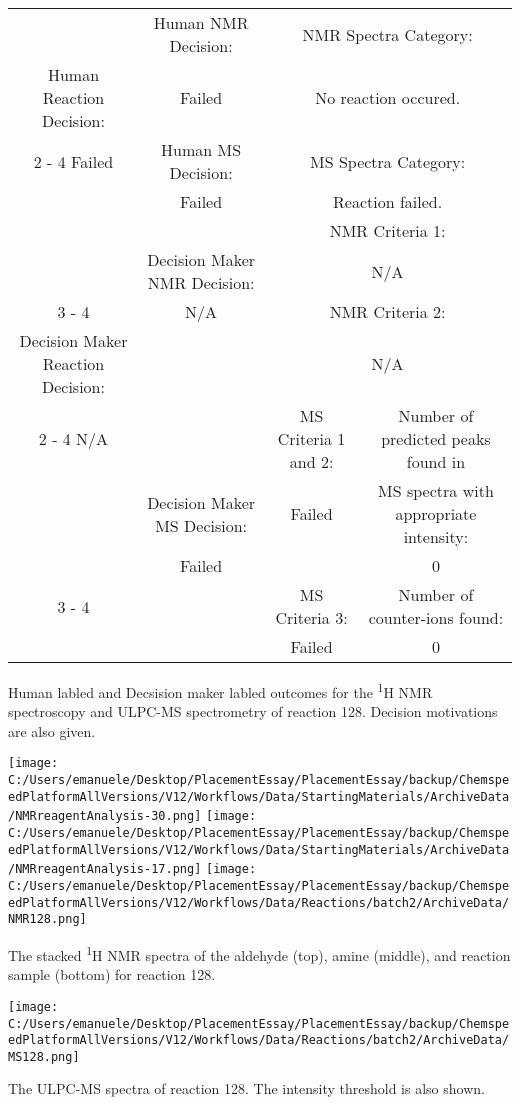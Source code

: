 \documentclass{article}%
\begin{document}
\begin{Decision Table}[H]%
\begin{tabular}{|c|c|c|c|}%
\hline%
&Human NMR Decision:&\multicolumn{2}{|c|}{NMR Spectra Category:}\\%
Human Reaction Decision:&Failed&\multicolumn{2}{|c|}{No reaction occured.}\\%
\cline{2%
-%
4}%
Failed&Human MS Decision:&\multicolumn{2}{|c|}{MS Spectra Category:}\\%
&Failed&\multicolumn{2}{|c|}{Reaction failed.}\\%
\hline%
&&\multicolumn{2}{|c|}{NMR Criteria 1:}\\%
&Decision Maker NMR Decision:&\multicolumn{2}{|c|}{N/A}\\%
\cline{3%
-%
4}%
&N/A&\multicolumn{2}{|c|}{NMR Criteria 2:}\\%
Decision Maker Reaction Decision:&&\multicolumn{2}{|c|}{N/A}\\%
\cline{2%
-%
4}%
N/A&&MS Criteria 1 and 2:&Number of predicted peaks found in\\%
&Decision Maker MS Decision:&Failed&MS spectra with appropriate intensity:\\%
&Failed&&0\\%
\cline{3%
-%
4}%
&&MS Criteria 3:&Number of counter{-}ions found:\\%
&&Failed&0\\%
\hline%
\end{tabular}%
\caption{Human labled and Decsision maker labled outcomes for the \textsuperscript{1}H NMR spectroscopy and ULPC-MS spectrometry of reaction 128. Decision motivations are also given.}%
\end{Decision Table}%
\begin{NMR Spectra}[H]%
\begin{center}%
\texttt{[image: C:/Users/emanuele/Desktop/PlacementEssay/PlacementEssay/backup/ChemspeedPlatformAllVersions/V12/Workflows/Data/StartingMaterials/ArchiveData/NMRreagentAnalysis-30.png]}\hfill%
\texttt{[image: C:/Users/emanuele/Desktop/PlacementEssay/PlacementEssay/backup/ChemspeedPlatformAllVersions/V12/Workflows/Data/StartingMaterials/ArchiveData/NMRreagentAnalysis-17.png]}\hfill%
\texttt{[image: C:/Users/emanuele/Desktop/PlacementEssay/PlacementEssay/backup/ChemspeedPlatformAllVersions/V12/Workflows/Data/Reactions/batch2/ArchiveData/NMR128.png]}\hfill%
\end{center}%
\caption{The stacked \textsuperscript{1}H NMR spectra of the aldehyde (top), amine (middle), and reaction sample (bottom) for reaction 128.}%
\end{NMR Spectra}%
\begin{MS Spectra}[H]%
\begin{center}%
\texttt{[image: C:/Users/emanuele/Desktop/PlacementEssay/PlacementEssay/backup/ChemspeedPlatformAllVersions/V12/Workflows/Data/Reactions/batch2/ArchiveData/MS128.png]}\hfill%
\end{center}%
\caption{The ULPC-MS spectra of reaction 128. The intensity threshold is also shown.}%
\end{MS Spectra}%
\end{document}
